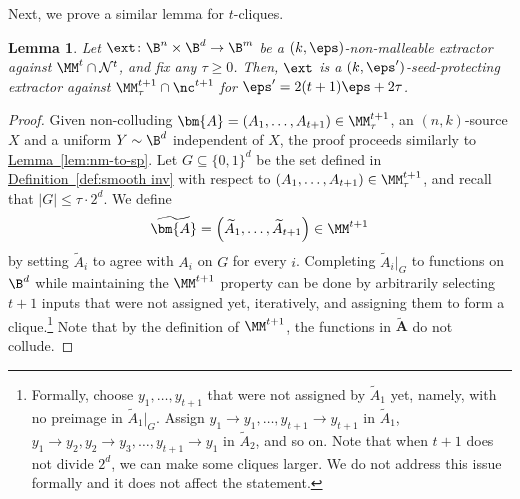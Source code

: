 \documentclass[11pt]{article}
\numberwithin{equation}{section}
\newtheorem{lemma}[theorem]{Lemma}
\theoremstyle{definition}
\theoremstyle{plain}
\newcommand{\expref}[2]{\hyperref[#2]{#1~\ref{#2}}}
\begin{document}
Next, we prove a similar lemma for $t$-cliques. 
\begin{lemma}\label{lem:nm-to-sp2}
Let $\ext \colon \B^{n} \times \B^{d} \rightarrow \B^{m}$ be a $(k,\eps)$-non-malleable extractor
against $\MM^t \cap \mathcal{N}^{t}$, and fix any $\tau \ge 0$. Then, $\ext$ is a $(k,\eps')$-seed-protecting extractor against $\MM^{t+1}_{\tau} \cap \nc^{t+1}$ for
$\eps' = 2(t+1)\eps + 2\tau$. 
\end{lemma}
\begin{proof}
Given %
non-colluding  %
$\bm{A} = \left(A_1,\ldots,A_{t+1} \right) \in \MM_{\tau}^{t+1}$,
an $(n,k)$-source $X$ and a uniform $Y \sim \B^d$ independent of $X$,
the proof proceeds similarly to \expref{Lemma}{lem:nm-to-sp}. Let $G \subseteq \{0,1\}^d$ be the set defined in \expref{Definition}{def:smooth inv} with respect to $(A_1,\ldots,A_{t+1}) \in \MM^{t+1}_{\tau}$, and recall that $|G| \le \tau \cdot 2^d$.
We define 
%
%
\[\widetilde{\bm{A}} = \left(\widetilde{A}_1,\ldots,\widetilde{A}_{t+1}\right) \in \MM^{t+1}\]
by setting $\widetilde{A}_i$ to agree with $A_i$ on $G$ for every $i$.
%
Completing $\widetilde{A}_i|_{G}$ to functions on $\B^d$ while maintaining the $\MM^{t+1}$ property can
be done by arbitrarily selecting $t+1$ inputs that were not assigned yet, iteratively, and assigning them
to form a clique.\footnote{Formally, choose $y_1,\ldots,y_{t+1}$ that
were not assigned by $\widetilde{A}_1$ yet, namely, with no preimage in $\widetilde{A}_1|_G$. 
Assign $y_1 \rightarrow y_1,\ldots,y_{t+1} \rightarrow y_{t+1}$ in $\widetilde{A}_1$, 
$y_1 \rightarrow y_2,y_2 \rightarrow y_3,\ldots,y_{t+1}\rightarrow y_{1}$ in $\widetilde{A}_2$,
and so on. Note that when $t+1$ does not divide $2^d$, we can make some cliques larger. We do not address this issue formally and it does not affect the statement.}
Note that by the definition of $\MM^{t+1}$, the functions in $\widetilde{\bm{A}}$ do not collude.  



\end{proof}
\end{document}

